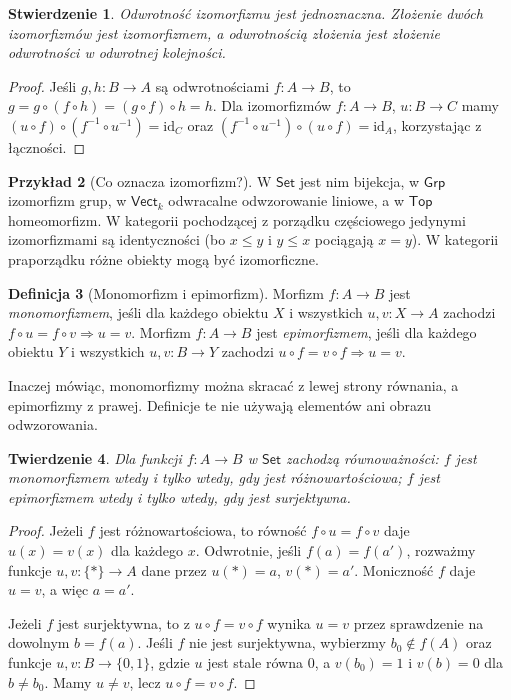 \documentclass[11pt,a4paper]{article}
\numberwithin{equation}{section}
\theoremstyle{plain}
\newtheorem{twierdzenie}{Twierdzenie}[section]
\newtheorem{stwierdzenie}[twierdzenie]{Stwierdzenie}
\theoremstyle{definition}
\newtheorem{definicja}[twierdzenie]{Definicja}
\newtheorem{przyklad}[twierdzenie]{Przykład}
\theoremstyle{remark}
\newcommand{\cat}[1]{\mathsf{#1}}
\newcommand{\Set}{\cat{Set}}
\newcommand{\Grp}{\cat{Grp}}
\newcommand{\Top}{\cat{Top}}
\newcommand{\Vect}{\cat{Vect}}
\newcommand{\id}{\mathrm{id}}
\begin{document}
\begin{stwierdzenie}
Odwrotność izomorfizmu jest jednoznaczna. Złożenie dwóch izomorfizmów jest izomorfizmem, a odwrotnością złożenia jest złożenie odwrotności w odwrotnej kolejności.
\end{stwierdzenie}
\begin{proof}
Jeśli $g,h:B\to A$ są odwrotnościami $f:A\to B$, to $g=g\circ(f\circ h)=(g\circ f)\circ h=h$. Dla izomorfizmów $f:A\to B$, $u:B\to C$ mamy $(u\circ f)\circ(f^{-1}\circ u^{-1})=\id_C$ oraz $(f^{-1}\circ u^{-1})\circ(u\circ f)=\id_A$, korzystając z łączności.
\end{proof}

\begin{przyklad}[Co oznacza izomorfizm?]
W $\Set$ jest nim bijekcja, w $\Grp$ izomorfizm grup, w $\Vect_k$ odwracalne odwzorowanie liniowe, a w $\Top$ homeomorfizm. W kategorii pochodzącej z porządku częściowego jedynymi izomorfizmami są identyczności (bo $x\leq y$ i $y\leq x$ pociągają $x=y$). W kategorii praporządku różne obiekty mogą być izomorficzne.
\end{przyklad}

\begin{definicja}[Monomorfizm i epimorfizm]\label{def:mono-epi}
Morfizm $f:A\to B$ jest \emph{monomorfizmem}, jeśli dla każdego obiektu $X$ i wszystkich $u,v:X\to A$ zachodzi $f\circ u=f\circ v\Rightarrow u=v$. Morfizm $f:A\to B$ jest \emph{epimorfizmem}, jeśli dla każdego obiektu $Y$ i wszystkich $u,v:B\to Y$ zachodzi $u\circ f=v\circ f\Rightarrow u=v$.
\end{definicja}

Inaczej mówiąc, monomorfizmy można skracać z lewej strony równania, a epimorfizmy z prawej. Definicje te nie używają elementów ani obrazu odwzorowania.

\begin{twierdzenie}\label{tw:set-mono-epi}
Dla funkcji $f:A\to B$ w $\Set$ zachodzą równoważności: $f$ jest monomorfizmem wtedy i tylko wtedy, gdy jest różnowartościowa; $f$ jest epimorfizmem wtedy i tylko wtedy, gdy jest surjektywna.
\end{twierdzenie}
\begin{proof}
Jeżeli $f$ jest różnowartościowa, to równość $f\circ u=f\circ v$ daje $u(x)=v(x)$ dla każdego $x$. Odwrotnie, jeśli $f(a)=f(a')$, rozważmy funkcje $u,v:\{*\}\to A$ dane przez $u(*)=a$, $v(*)=a'$. Moniczność $f$ daje $u=v$, a więc $a=a'$.

Jeżeli $f$ jest surjektywna, to z $u\circ f=v\circ f$ wynika $u=v$ przez sprawdzenie na dowolnym $b=f(a)$. Jeśli $f$ nie jest surjektywna, wybierzmy $b_0\notin f(A)$ oraz funkcje $u,v:B\to\{0,1\}$, gdzie $u$ jest stale równa $0$, a $v(b_0)=1$ i $v(b)=0$ dla $b\neq b_0$. Mamy $u\neq v$, lecz $u\circ f=v\circ f$.
\end{proof}
\end{document}
